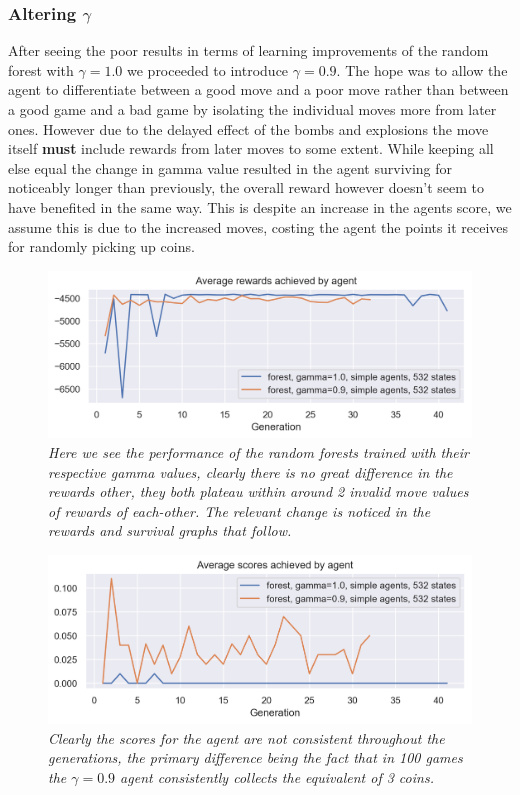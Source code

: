 \subsubsection{Altering $\gamma$}
After seeing the poor results in terms of learning improvements of the random forest with $\gamma = 1.0$ we proceeded to introduce $\gamma = 0.9$. The hope was to allow the agent to differentiate between a good move and a poor move rather than between a good game and a bad game by isolating the individual moves more from later ones. However due to the delayed effect of the bombs and explosions the move itself \textbf{must} include rewards from later moves to some extent. While keeping all else equal the change in gamma value resulted in the agent surviving for noticeably longer than previously, the overall reward however doesn't seem to have benefited in the same way. This is despite an increase in the agents score, we assume this is due to the increased moves, costing the agent the points it receives for randomly picking up coins.
\begin{figure}[!h]
\centering
	\includegraphics[width=\linewidth]{images/forest09_vs_forest1rew.png}
	\caption{\textit{Here we see the performance of the random forests trained with their respective gamma values, clearly there is no great difference in the rewards other, they both plateau within around 2 invalid move values of rewards of each-other. The relevant change is noticed in the rewards and survival graphs that follow.}}
	\label{forest09_vs_forest1rew}
\end{figure}
\begin{figure}[!h]
\centering
	\includegraphics[width=\linewidth]{images/forest09_vs_forest1sco.png}
	\caption{\textit{Clearly the scores for the agent are not consistent throughout the generations, the primary difference being the fact that in 100 games the $\gamma = 0.9$ agent consistently collects the equivalent of 3 coins.}}
	\label{forest09_vs_forest1sco}
\end{figure}
